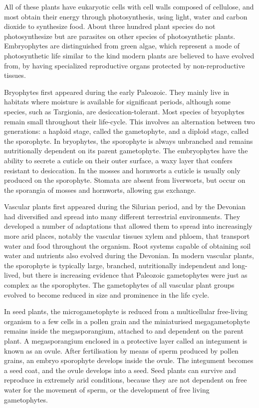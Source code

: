 All of these plants have eukaryotic cells with cell walls composed of cellulose, and most obtain their energy through photosynthesis, using light, water and carbon dioxide to synthesize food. About three hundred plant species do not photosynthesize but are parasites on other species of photosynthetic plants. Embryophytes are distinguished from green algae, which represent a mode of photosynthetic life similar to the kind modern plants are believed to have evolved from, by having specialized reproductive organs protected by non-reproductive tissues.

Bryophytes first appeared during the early Paleozoic. They mainly live in habitats where moisture is available for significant periods, although some species, such as Targionia, are desiccation-tolerant. Most species of bryophytes remain small throughout their life-cycle. This involves an alternation between two generations: a haploid stage, called the gametophyte, and a diploid stage, called the sporophyte. In bryophytes, the sporophyte is always unbranched and remains nutritionally dependent on its parent gametophyte. The embryophytes have the ability to secrete a cuticle on their outer surface, a waxy layer that confers resistant to desiccation. In the mosses and hornworts a cuticle is usually only produced on the sporophyte. Stomata are absent from liverworts, but occur on the sporangia of mosses and hornworts, allowing gas exchange.

Vascular plants first appeared during the Silurian period, and by the Devonian had diversified and spread into many different terrestrial environments. They developed a number of adaptations that allowed them to spread into increasingly more arid places, notably the vascular tissues xylem and phloem, that transport water and food throughout the organism. Root systems capable of obtaining soil water and nutrients also evolved during the Devonian. In modern vascular plants, the sporophyte is typically large, branched, nutritionally independent and long-lived, but there is increasing evidence that Paleozoic gametophytes were just as complex as the sporophytes. The gametophytes of all vascular plant groups evolved to become reduced in size and prominence in the life cycle.

In seed plants, the microgametophyte is reduced from a multicellular free-living organism to a few cells in a pollen grain and the miniaturised megagametophyte remains inside the megasporangium, attached to and dependent on the parent plant. A megasporangium enclosed in a protective layer called an integument is known as an ovule. After fertilisation by means of sperm produced by pollen grains, an embryo sporophyte develops inside the ovule. The integument becomes a seed coat, and the ovule develops into a seed. Seed plants can survive and reproduce in extremely arid conditions, because they are not dependent on free water for the movement of sperm, or the development of free living gametophytes.

